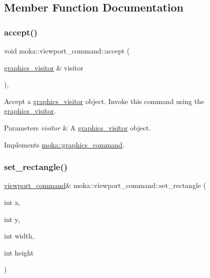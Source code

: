 \subsection{Member Function Documentation}
\mbox{\label{classmoka_1_1viewport__command_a8344d1f3a278d8fe04f1f6c86d0877c1}} 
\subsubsection{\texorpdfstring{accept()}{accept()}}
{\footnotesize\ttfamily void moka\+::viewport\+\_\+command\+::accept (\begin{DoxyParamCaption}\item[{\mbox{\hyperlink{classmoka_1_1graphics__visitor}{graphics\+\_\+visitor}} \&}]{visitor }\end{DoxyParamCaption})\hspace{0.3cm}{\ttfamily [override]}, {\ttfamily [virtual]}}



Accept a \mbox{\hyperlink{classmoka_1_1graphics__visitor}{graphics\+\_\+visitor}} object. Invoke this command using the \mbox{\hyperlink{classmoka_1_1graphics__visitor}{graphics\+\_\+visitor}}. 


\begin{DoxyParams}{Parameters}
{\em visitor} & A \mbox{\hyperlink{classmoka_1_1graphics__visitor}{graphics\+\_\+visitor}} object. \\
\hline
\end{DoxyParams}


Implements \mbox{\hyperlink{classmoka_1_1graphics__command_a7affaeceb1019ab358c62185bce4e654}{moka\+::graphics\+\_\+command}}.

\mbox{\label{classmoka_1_1viewport__command_a48ee8475ca7476660ded9ddd54245581}} 
\subsubsection{\texorpdfstring{set\_rectangle()}{set\_rectangle()}\hspace{0.1cm}{\footnotesize\ttfamily [1/2]}}
{\footnotesize\ttfamily \mbox{\hyperlink{classmoka_1_1viewport__command}{viewport\+\_\+command}}\& moka\+::viewport\+\_\+command\+::set\+\_\+rectangle (\begin{DoxyParamCaption}\item[{int}]{x,  }\item[{int}]{y,  }\item[{int}]{width,  }\item[{int}]{height }\end{DoxyParamCaption})}



